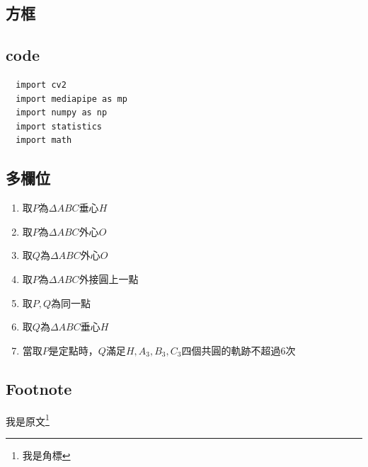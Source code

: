 \subsection{方框}

\subsection{code}

\begin{lstlisting}
  import cv2
  import mediapipe as mp
  import numpy as np
  import statistics
  import math
\end{lstlisting}

\subsection{多欄位}
\begin{multicols}{2}
  \begin{enumerate}[label=(\roman*)]
  \item 取$P$為$\Delta ABC$垂心$H$
  \item {\color{blue}取$P$為$\Delta ABC$外心$O$}
  \item {\color[RGB]{0,255,200}取$Q$為$\Delta ABC$外心$O$}
  \item 取$P$為$\Delta ABC$外接圓上一點
  \item 取$P,Q$為同一點
  \item 取$Q$為$\Delta ABC$垂心$H$
  \item 當取$P$是定點時，$Q$滿足$H,A_3,B_3,C_3$四個共圓的軌跡不超過6次
  \end{enumerate}
\end{multicols}

\subsection{Footnote}
  我是原文\footnote{我是角標}



\newpage
